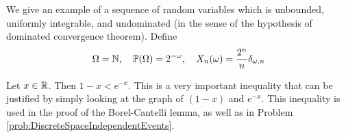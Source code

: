\begin{example}
	We give an example of a sequence of random variables which is unbounded, uniformly integrable, and undominated (in the sense of the hypothesis of dominated convergence theorem). Define
	\[ \Omega = \mathbb{N},\quad \mathbb{P}(\Omega)=2^{-\omega},\quad X_n(\omega) = \frac{2^n}{n}\delta_{\omega,n} \]
\end{example}


\begin{observation}
	Let $ x\in \mathbb{R} $. Then $ 1-x < e^{-x} $. This is a very important inequality that can be justified by simply looking at the graph of $ (1-x) $ and $ e^{-x} $. This inequality is used in the proof of the Borel-Cantelli lemma, as well as in Problem \autoref{prob:DiscreteSpaceIndependentEvents}.
\end{observation}